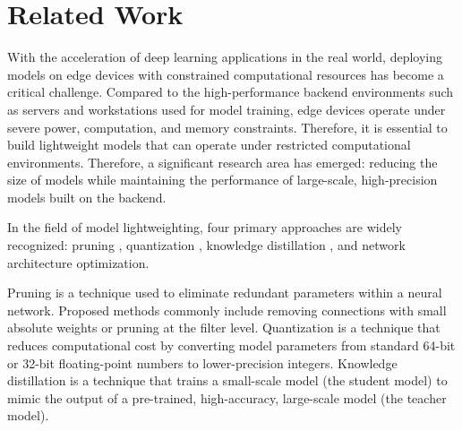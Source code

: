 \documentclass[conference]{IEEEtran}
\begin{document}
\section{Related Work}
With the acceleration of deep learning applications in the real world, deploying models on edge devices with constrained computational resources has become a critical challenge. Compared to the high-performance backend environments such as servers and workstations used for model training, edge devices operate under severe power, computation, and memory constraints. Therefore, it is essential to build lightweight models that can operate under restricted computational environments. Therefore, a significant research area has emerged: reducing the size of models while maintaining the performance of large-scale, high-precision models built on the backend.

In the field of model lightweighting, four primary approaches are widely recognized: pruning \cite{10643325}, quantization \cite{10.1145/3451211}, knowledge distillation \cite{hinton2015distillingknowledgeneuralnetwork}, and network architecture optimization.

Pruning is a technique used to eliminate redundant parameters within a neural network. Proposed methods commonly include removing connections with small absolute weights or pruning at the filter level. Quantization is a technique that reduces computational cost by converting model parameters from standard 64-bit or 32-bit floating-point numbers to lower-precision integers. Knowledge distillation is a technique that trains a small-scale model (the student model) to mimic the output of a pre-trained, high-accuracy, large-scale model (the teacher model).
\end{document}
